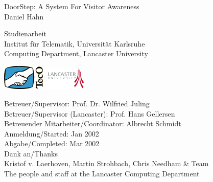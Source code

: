 \documentclass[a4paper]{danarticle}
\theoremstyle{remark}
\begin{document}
  \begin{titlepage}
    \raggedleft
    \vspace{2cm}
    \sffamily
    {\huge
    DoorStep: A System For Visitor Awareness\\
    }
    {\large
    Daniel Hahn\\
    }
    \vspace{2cm}
    \raggedright
    {\Large
    \hspace{2cm}Studienarbeit\\
    }
    {\large
    \hspace{2cm}Institut f\"ur Telematik, Universit\"at Karlsruhe\\
    \hspace{2cm}Computing Department, Lancaster University\\
    }
    \vspace{1cm}
    \begin{center}
      \includegraphics[width=2cm]{tecologo}
      \hspace{1cm}
      \includegraphics[width=2cm]{lancslogo}
    \end{center}
    \vspace{5cm}
    {\normalsize
    \hspace{2cm}Betreuer/Supervisor: Prof. Dr. Wilfried Juling \\
    \hspace{2cm}Betreuer/Supervisor (Lancaster): Prof. Hans Gellersen \\
    \vspace{5mm}
    \hspace{2cm}Betreuender Mitarbeiter/Coordinator: Albrecht Schmidt \\
    }
    \vspace{2cm}
    {\normalsize
    \hspace{2cm}Anmeldung/Started: Jan 2002 \\
    \hspace{2cm}Abgabe/Completed: Mar 2002 \\
    }
    \vspace{4cm}
    \centering
    {\small 
    Dank an/Thanks \\
    Kristof v. Laerhoven, Martin Strohbach, Chris Needham \& Team \\
    The people and staff at the Lancaster Computing Department \\
    }
  \end{titlepage}
\end{document}
